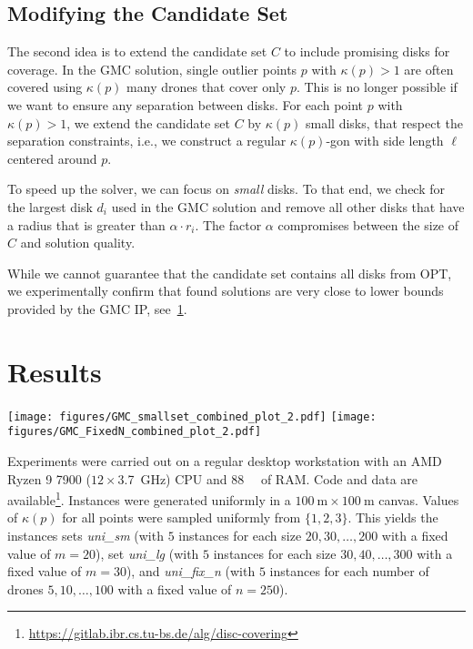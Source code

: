 \documentclass[letterpaper, 10 pt, conference]{ieeeconf}
\newcommand{\point}{p}
\newcommand{\smallFixM}{\emph{uni\_sm}}
\newcommand{\largeFixM}{\emph{uni\_lg}}
\newcommand{\fixN}{\emph{uni\_fix\_n}}
\newcommand{\gmcip}{GMC IP}
\begin{document}
\subsection{Modifying the Candidate Set}\label{sec:candidate-set-modification}
The second idea is to extend the candidate set $C$ to include promising disks for coverage.
In the GMC solution, single outlier points $\point$ with $\kappa(\point)>1$ are often covered using $\kappa(\point)$ many drones that cover only $\point$.
This is no longer possible if we want to ensure any separation between disks.
For each point $\point$ with $\kappa(\point)>1$, we extend the candidate set $C$ by $\kappa(\point)$ small disks, that respect the separation constraints, i.e., we construct a regular $\kappa(\point)$-gon with side length $\ell$ centered around $\point$.

To speed up the solver, we can focus on \emph{small} disks.
To that end, we check for the largest disk $d_i$ used in the GMC solution and remove all other disks that have a radius that is greater than $\alpha\cdot r_i$.
The factor $\alpha$ compromises between the size of $C$ and solution quality.

While we cannot guarantee that the candidate set contains all disks from OPT, we experimentally confirm that found solutions are very close to lower bounds provided by the GMC IP, see~\cref{sec:Results}.


\section{Results} \label{sec:Results}

\begin{figure*}[t]
    \hfill
    \texttt{[image: figures/GMC\_smallset\_combined\_plot\_2.pdf]}
    \hfill
    \texttt{[image: figures/GMC\_FixedN\_combined\_plot\_2.pdf]}
    \hfill
    \caption{\label{fig:gmc}
        Comparison of runtime, total area, and optimality gap between the \gmcip{} solver and the heuristic. On all plots, lower is better. (Left) \smallFixM{}; fixed $m=20$ variable $n$ (Right) \fixN{}; fixed $n=250$ variable $m$.
    }
\end{figure*}

Experiments were carried out on a regular desktop workstation with an
AMD Ryzen 9 7900 ($12\times$\SI{3.7}{\giga\hertz}) CPU and \SI{88}{\giga\byte} of RAM.
Code and data are available\footnote{\url{https://gitlab.ibr.cs.tu-bs.de/alg/disc-covering}}.
Instances were generated uniformly in a $\SI{100}{\metre}\times \SI{100}{\metre}$ canvas.
Values of $\kappa(\point)$ for all points were sampled uniformly from $\{1,2,3\}$.
This yields the instances sets
\smallFixM{} (with $5$ instances for each size $20, 30, \dots, 200$ with a fixed value of $m=20$),
set \largeFixM{} (with $5$ instances for each size $30,40,\dots, 300$ with a fixed value of $m=30$),
and \fixN{} (with $5$ instances for each number of drones $5,10,\ldots, 100$ with a fixed value of $n=250$).
\end{document}
